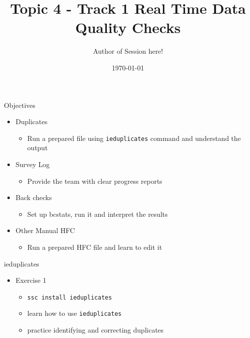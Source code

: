 \documentclass[aspectratio=169]{beamer}
\title{Topic 4 - Track 1 \newline Real Time Data Quality Checks}
\date{\today}
\author{Author of Session here!} %
\institute{Development Impact Evaluation (DIME) \newline The World Bank }
\begin{document}
	
	{
		\maketitle
	}

\begin{frame}{Objectives}
	\begin{itemize}
		\item Duplicates
		\begin{itemize}
			\item Run a prepared file using \texttt{ieduplicates} command and understand the output
		\end{itemize}
		\item Survey Log
		\begin{itemize}
			\item Provide the team with clear progress reports
		\end{itemize}
		\item Back checks 
		\begin{itemize}
			\item Set up bcstats, run it and interpret the results
		\end{itemize}
		\item Other Manual HFC
		\begin{itemize}
			\item Run a prepared HFC file and learn to edit it
		\end{itemize}
	\end{itemize}
\end{frame}

\begin{frame}{ieduplicates}
	\begin{itemize}
		\item Exercise 1
		\begin{itemize}
			\item \texttt{ssc install ieduplicates}
			\item learn how to use \texttt{ieduplicates}
			\item practice identifying and correcting duplicates
		\end{itemize}
	\end{itemize}
\end{frame}
\end{document}
